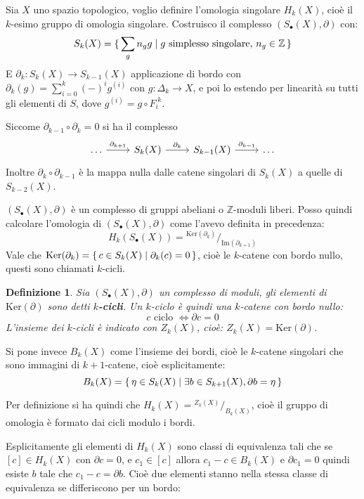 \documentclass[10pt, twoside=false, x11names]{scrbook}
\newtheorem{definition}[theorem]{Definizione}
\newcommand{\Z}{\mathbb{Z}}
\newcommand{\im}[1]{\mathrm{Im}( #1 )}
\renewcommand{\ker}[1]{\mathrm{Ker}( #1)}
\newcommand*\quot[2]{{^{\textstyle #1}\big/_{\textstyle #2}}}
\begin{document}

Sia $ X $ uno spazio topologico, voglio definire l'omologia singolare $ H_k(X) $, cioè il $ k $-esimo gruppo di omologia
singolare. Costruisco il complesso $ (S_\bullet(X), \partial) $ con:
\[
  S_k(X) = \set{ \sum_g n_g g | g \text{ simplesso singolare, } n_g \in \Z }
\]
E $ \partial_k : S_k(X) \to S_{k-1}(X) $ applicazione di bordo con $ \partial_k(g) = \sum_{i=0}^k(-)^ig^{(i)} $ con $ g: \Delta_k \to X $, e poi lo estendo per
linearità su tutti gli elementi di $ S $, dove $ g^{(i)} = g \circ F_i^{\; k} $.

Siccome $ \partial_{k-1} \circ \partial_k = 0 $ si ha il complesso
\[
  \begin{tikzcd}
   \dots \arrow{r}{\partial_{k+1}} & S_k(X) \arrow{r}{\partial_k} & S_{k-1}(X) \arrow{r}{\partial_{k-1}} & \dots
  \end{tikzcd}
\]
Inoltre $ \partial_k \circ \partial_{k-1} $ è la mappa nulla dalle catene singolari di $ S_k(X) $
a quelle di $ S_{k-2}(X) $.

$ (S_\bullet(X), \partial) $ è un complesso di gruppi abeliani o $ \Z $-moduli liberi.
Posso quindi calcolare l'omologia di $ (S_\bullet(X),\partial) $ come l'avevo definita
in precedenza:
\[
  H_k(S_\bullet(X)) = \quot{\ker{\partial_k}}{\im{\partial_{k+1}}}
\]
Vale che $ \ker{\partial_k} = \set{c \in S_k(X) | \partial_k(c) = 0} $, cioè le $ k $-catene con
bordo nullo, questi sono chiamati $ k $-cicli.

\begin{definition}
  Sia $ (S_\bullet(X),\partial) $ un complesso di moduli, gli elementi di $ \ker{\partial} $ sono detti
  \textbf{$ k $-cicli}. Un $ k $-ciclo è quindi una $ k $-catene
  con bordo nullo:
  \[
    c \text{ ciclo } \Leftrightarrow \partial c = 0
  \]
  L'insieme dei $ k $-cicli è indicato con $ Z_k(X) $, cioè: $ Z_k(X) = \ker{\partial} $.
\end{definition}

Si pone invece $ B_k(X) $ come l'insieme dei bordi, cioè le $ k $-catene singolari
che sono immagini di $ k+1 $-catene, cioè esplicitamente:
\[
  B_k(X) = \set{\eta \in S_k(X) | \exists b \in S_{k+1}(X), \partial b = \eta}
\]

Per definizione si ha quindi che $ H_k(X) = \quot{Z_k(X)}{B_k(X)} $, cioè il gruppo
di omologia è formato dai cicli modulo i bordi.

Esplicitamente gli elementi di $ H_k(X) $ sono classi di equivalenza tali che se $ [c] \in H_k(X) $
con $ \partial c = 0 $, e $ c_1 \in [c] $ allora
$ c_1 - c \in B_k(X) $ e $ \partial c_1 = 0 $ quindi esiste $ b $ tale che $ c_1 - c = \partial b $.
Cioè due elementi stanno nella stessa classe di equivalenza se differiscono per un bordo:
\end{document}
